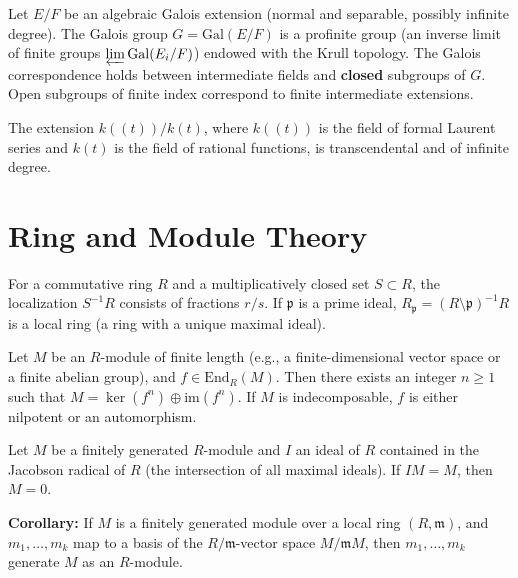 \begin{theorem}
Let $E/F$ be an algebraic Galois extension (normal and separable, possibly infinite degree). The Galois group $G = \mathrm{Gal}(E/F)$ is a profinite group (an inverse limit of finite groups $\varprojlim \mathrm{Gal}(E_i/F)$) endowed with the Krull topology. The Galois correspondence holds between intermediate fields and \textbf{closed} subgroups of $G$. Open subgroups of finite index correspond to finite intermediate extensions.
\end{theorem}

\begin{remark}
The extension $k((t)) / k(t)$, where $k((t))$ is the field of formal Laurent series and $k(t)$ is the field of rational functions, is transcendental and of infinite degree.
\end{remark}

\section{Ring and Module Theory}

\begin{definition}
For a commutative ring $R$ and a multiplicatively closed set $S \subset R$, the localization $S^{-1}R$ consists of fractions $r/s$. If $\mathfrak{p}$ is a prime ideal, $R_{\mathfrak{p}} = (R \setminus \mathfrak{p})^{-1}R$ is a local ring (a ring with a unique maximal ideal). 
\end{definition}

\begin{theorem}
Let $M$ be an $R$-module of finite length (e.g., a finite-dimensional vector space or a finite abelian group), and $f \in \mathrm{End}_R(M)$. Then there exists an integer $n \ge 1$ such that $M = \ker(f^n) \oplus \mathrm{im}(f^n)$. If $M$ is indecomposable, $f$ is either nilpotent or an automorphism.
\end{theorem}

\begin{theorem}
Let $M$ be a finitely generated $R$-module and $I$ an ideal of $R$ contained in the Jacobson radical of $R$ (the intersection of all maximal ideals). If $IM = M$, then $M = 0$. 

\textbf{Corollary:} If $M$ is a finitely generated module over a local ring $(R, \mathfrak{m})$, and $m_1, \dots, m_k$ map to a basis of the $R/\mathfrak{m}$-vector space $M/\mathfrak{m}M$, then $m_1, \dots, m_k$ generate $M$ as an $R$-module.
\end{theorem}

